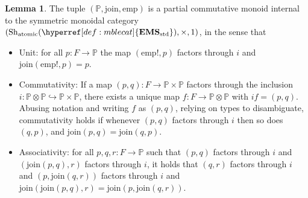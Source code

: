\documentclass[
  sigconf,
  screen, ]{acmart}
\theoremstyle{definition}
\newtheorem{lemma}[theorem]{Lemma}
\newcommand\nref[2]{\hyperref[#1]{#2}} \newcommand\checkhigh{{\huge{\color{red}\textbf{TODO: check}}}}
\newcommand\Shjat{\operatorname{Sh}_{{\rm atomic}}}
\newcommand\shotimes{\mathop{\otimes}}
\newcommand\texStdMble{\mathbf{EMS}_{\rm std}}
\newcommand\StdMble{{\nref{def:mblecat}{\texStdMble}}}
\newcommand\pcmjoin{{\nref{app:def:pspcs-tensor-join}{\mathrm{join}}}}
\newcommand\pcmunit{{\nref{app:def:pspcs-join-unit}{\mathrm{emp}}}}
\newcommand\texpspcs{\mathbb P}
\newcommand\pspcs{{\nref{def:mble-pspcs}{\texpspcs}}}
\begin{document}
\begin{lemma} \label{app:def:pspcs-join-unit-pcm}
  The tuple $(\pspcs, \pcmjoin,\pcmunit)$ is
  a partial commutative monoid internal
  to the symmetric monoidal category $(\Shjat(\StdMble),\times,1)$,
  in the sense that
  \begin{itemize}
  \item Unit: for all $p : F\to \pspcs$
    the map $(\pcmunit!,p)$ factors through $i$
    and $\pcmjoin(\pcmunit!,p) = p$.
  \item Commutativity: If a map $(p,q) : F\to \pspcs\times\pspcs$
    factors through the inclusion $i:\pspcs\shotimes\pspcs\hookrightarrow\pspcs\times\pspcs$,
    there exists a unique map $f: F\to \pspcs\shotimes\pspcs$
    with $if = (p,q)$.
    Abusing notation and writing $f$ as $(p,q)$, 
    relying on types to disambiguate,
    commutativity holds if
    whenever $(p,q)$ factors through $i$
    then so does $(q,p)$,
    and
     $\pcmjoin(p,q) = \pcmjoin(q,p)$.
  \item Associativity:
    for all $p,q,r : F\to \pspcs$
    such that $(p,q)$ factors through $i$
    and $(\pcmjoin(p,q),r)$ factors through $i$,
    it holds that $(q,r)$ factors through $i$
    and $(p,\pcmjoin(q,r))$ factors through $i$
    and $\pcmjoin(\pcmjoin(p,q),r)=\pcmjoin(p,\pcmjoin(q,r))$.
  \end{itemize}
\end{lemma}
\end{document}
